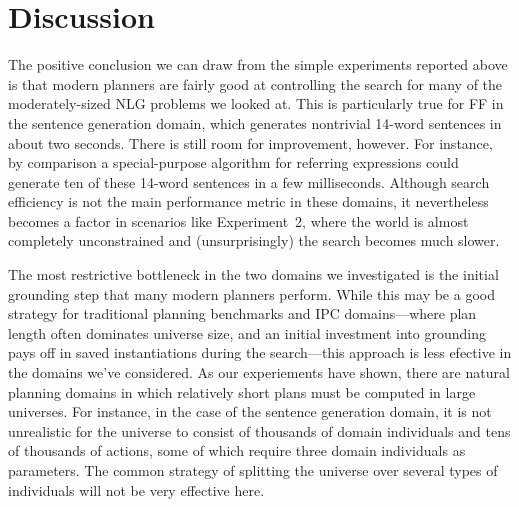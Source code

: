 \section{Discussion} \label{sec:discussion}

The positive conclusion we can draw from the simple experiments reported
above is that modern planners are fairly good at controlling the search for
many of the moderately-sized NLG problems we looked at. This is
particularly true for FF in the sentence generation domain, which generates
nontrivial 14-word sentences in about two seconds. There is still room for
improvement, however. For instance, by comparison a special-purpose
algorithm for referring expressions could generate ten of these 14-word
sentences in a few milliseconds. Although search efficiency is not the main
performance metric in these domains, it nevertheless becomes a factor in
scenarios like Experiment~2, where the world is almost completely
unconstrained and (unsurprisingly) the search becomes much slower.


The most restrictive bottleneck in the two domains we investigated is the
initial grounding step that many modern planners perform. While this may be
a good strategy for traditional planning benchmarks and IPC domains---where
plan length often dominates universe size, and an initial investment into
grounding pays off in saved instantiations during the search---this
approach is less efective in the domains we've considered. As our
experiements have shown, there are natural planning domains in which
relatively short plans must be computed in large universes. For instance,
in the case of the sentence generation domain, it is not unrealistic for
the universe to consist of thousands of domain individuals and tens of
thousands of actions, some of which require three domain individuals as
parameters. The common strategy of splitting the universe over several
types of individuals will not be very effective here.

